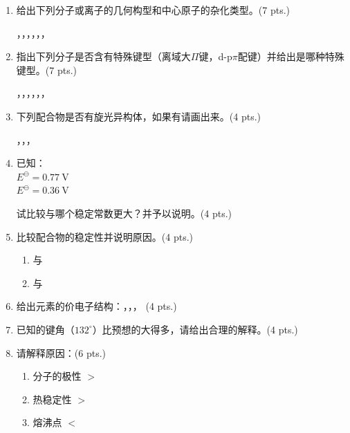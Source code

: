 \begin{enumerate}[label=\arabic*., start=1, itemsep=1.5ex]
    \item 给出下列分子或离子的几何构型和中心原子的杂化类型。(7 pts.)
    
    {\centering
    ，，，，，， \par
    }

    \item 指出下列分子是否含有特殊键型（离域大$\Pi$键，d-p$\pi$配键）并给出是哪种特殊键型。(7 pts.)
    
    {\centering
    ，，，，，， \par
    }

    \item 下列配合物是否有旋光异构体，如果有请画出来。(4 pts.)
    
    {\centering
    \ce{[PtCl4(NH3)2]}，\ce{[CoCl2(en)(NH3)2]^{+}}，\ce{[CoCl2(en)2]^{-}}，\ce{[PtCl4(en)]} \par
    }

    \item 已知：\\
     \quad $E^\ominus = 0.77\ \text{V}$ \\
     \quad $E^\ominus = 0.36\ \text{V}$

    试比较与哪个稳定常数更大？并予以说明。(4 pts.)

    \item 比较配合物的稳定性并说明原因。(4 pts.)
    \begin{enumerate}[label=(\arabic*), itemsep=1ex]
        \item {}与
        \item {}与
    \end{enumerate}

    \item 给出元素的价电子结构：，，， (4 pts.)
    
    \item 已知的键角（$132^\circ$）比预想的大得多，请给出合理的解释。(4 pts.)
    
    \item 请解释原因：(6 pts.)
    \begin{enumerate}[label=(\arabic*), itemsep=1ex]
        \item 分子的极性 \quad {} $>$ 
        \item 热稳定性 \quad {} $>$ 
        \item 熔沸点 \quad {} $<$ 
    \end{enumerate}


\end{enumerate}
